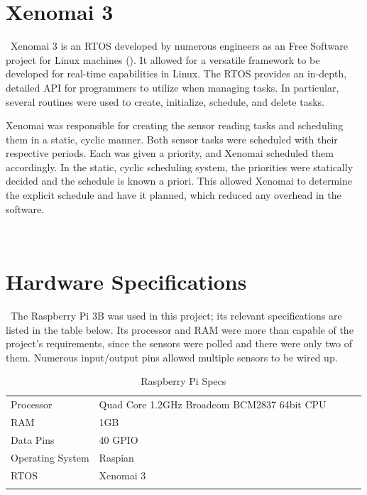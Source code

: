 \documentclass[letterpaper, 12pt]{article}
\begin{document}
\section{Xenomai 3}
~\indent Xenomai 3 is an RTOS developed by numerous engineers as an Free Software project for Linux machines (\cite{xenomai2018}).  It allowed for a versatile framework to be developed for real-time capabilities in Linux.  The RTOS provides an in-depth, detailed API for programmers to utilize when managing tasks.  In particular, several routines were used to create, initialize, schedule, and delete tasks.

\indent Xenomai was responsible for creating the sensor reading tasks and scheduling them in a static, cyclic manner.  Both sensor tasks were scheduled with their respective periods.  Each was given a priority, and Xenomai scheduled them accordingly.  In the static, cyclic scheduling system, the priorities were statically decided and the schedule is known a priori.  This allowed Xenomai to determine the explicit schedule and have it planned, which reduced any overhead in the software.

~\newpage
\section{Hardware Specifications}
~\indent The Raspberry Pi 3B was used in this project; its relevant specifications are listed in the table below.  Its processor and RAM were more than capable of the project's requirements, since the sensors were polled and there were only two of them.  Numerous input/output pins allowed multiple sensors to be wired up.
~\newline
\begin{table}[hbt]
	\centering
	\caption{Raspberry Pi Specs}
	\label{my-label}
	\begin{tabular}{lllll}
		\cline{1-2}
		\multicolumn{1}{|l|}{Processor} & \multicolumn{1}{l|}{Quad Core 1.2GHz Broadcom BCM2837 64bit CPU} &  &  &  \\ \cline{1-2}
		\multicolumn{1}{|l|}{RAM} & \multicolumn{1}{l|}{1GB} &  &  &  \\ \cline{1-2}
		\multicolumn{1}{|l|}{Data Pins} & \multicolumn{1}{l|}{40 GPIO} &  &  &  \\ \cline{1-2}
		\multicolumn{1}{|l|}{Operating System} & \multicolumn{1}{l|}{Raspian} &  &  &  \\ \cline{1-2}
		\multicolumn{1}{|l|}{RTOS} & \multicolumn{1}{l|}{Xenomai 3} &  &  &  \\ \cline{1-2}
		&                       &  &  & 
	\end{tabular}
\end{table}
\end{document}
